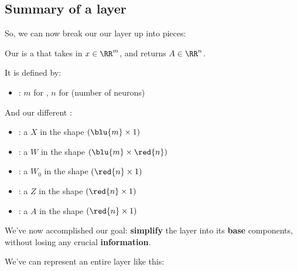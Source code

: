     \subsection{Summary of a layer}
    
        So, we can now break our our layer up into pieces:\\
        
        \begin{notation}
            Our  is a  that takes in $x \in \RR^m$, and returns $A \in \RR^n$.
            
            It is defined by:
            
            \begin{itemize}
                \item {}: $m$ for , $n$ for  (number of neurons)
            \end{itemize}
            
            And our different :
            
            \begin{itemize}
                \item {}: a  $X$ in the shape $(\blu{m} \times 1)$
            
                \item {}: a  $W$ in the shape $(\blu{m} \times \red{n})$
                
                \item {}: a  $W_0$ in the shape $(\red{n} \times 1)$
                
                \item {}: a  $Z$ in the shape $(\red{n} \times 1)$
                
                \item {}: a  $A$ in the shape $(\red{n} \times 1)$
            \end{itemize}
        \end{notation}
        
        We've now accomplished our goal: \textbf{simplify} the layer into its \textbf{base} components, without losing any crucial \textbf{information}.
        
        We've can represent an entire layer like this:
        
